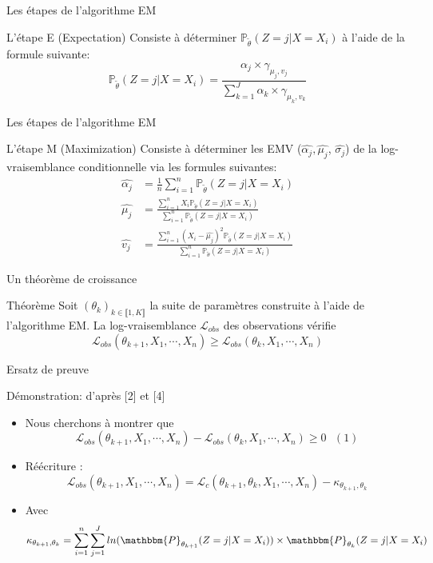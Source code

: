 \documentclass[11pt]{beamer}
\begin{document}
	\begin{frame}{Les étapes de l'algorithme EM}
		\begin{block}{L'étape E (Expectation)}
			Consiste à déterminer $\mathbb{P}_{\tilde{\theta}}(Z = j | X = X_i)$ à l'aide de la formule suivante:
			\[
				\mathbb{P}_{\tilde{\theta}}(Z = j| X = X_i) = \frac{\alpha_j \times \gamma_{\mu_j, v_j}}{\sum_{k=1}^{J} \alpha_k \times \gamma_{\mu_k, v_k}}
			\]
		\end{block}
	\end{frame}
	\begin{frame}{Les étapes de l'algorithme EM}
		\begin{block}{L'étape M (Maximization)}
			Consiste à déterminer les EMV ($\widehat{\alpha_j}, \widehat{\mu_j}$, $\widehat{\sigma_j}$) de la log-vraisemblance conditionnelle via les formules suivantes:
			\begin{align*}
				\widehat{\alpha_j} &= \frac{1}{n}\sum_{i=1}^n \mathbb{P}_{\tilde{\theta}}(Z = j| X = X_i) \\
				\widehat{\mu_j} &= \frac{\sum_{i=1}^n X_i\mathbb{P}_{\tilde{\theta}}(Z = j| X = X_i)}{\sum_{i=1}^n \mathbb{P}_{\tilde{\theta}}(Z = j| X = X_i)} \\
				\widehat{v_j} &= \frac{\sum_{i=1}^n (X_i -\widehat{\mu_j})^2 \mathbb{P}_{\tilde{\theta}}(Z = j| X = X_i)}{\sum_{i=1}^n\mathbb{P}_{\tilde{\theta}}(Z = j| X = X_i)}
			\end{align*}
		\end{block}
	\end{frame}

	\begin{frame}{Un théorème de croissance}
		\begin{block}{Théorème}
			Soit $(\theta_k)_{k\in \llbracket1, K\rrbracket}$ la suite de paramètres construite à l'aide de l'algorithme EM. \newline
La log-vraisemblance $\mathcal{L}_{obs}$ des observations vérifie 
		\[
		\mathcal{L}_{obs}(\theta_{k+1}, X_1, \cdots, X_n) \geq \mathcal{L}_{obs}(\theta_k, X_1, \cdots, X_n)
		\]
		\end{block}
	\end{frame}

	\begin{frame}{Ersatz de preuve}
		\begin{block}{Démonstration: d'après [2] et [4]}
			\begin{itemize}
				\item Nous cherchons à montrer que
				\[
				\mathcal{L}_{obs}(\theta_{k+1}, X_1, \cdots, X_n) - \mathcal{L}_{obs}(\theta_k, X_1, \cdots, X_n) \geq 0 \text{   }(1)
				\]
				\item Réécriture :
				\[
				 \mathcal{L}_{obs}(\theta_{k+1}, X_1, \cdots, X_n) = 
				\mathcal{L}_c(\theta_{k+1}, \theta_k, X_1, \cdots, X_n) - \kappa_{\theta_{k+1},\theta_k}
				\]
				\item Avec
					\[
					 \kappa_{\theta_{k+1},\theta_k} = \sum_{i=1}^n\sum_{j=1}^J ln(\mathbbm{P}_{\theta_{k+1}}(Z = j|X=X_i))\times\mathbbm{P}_{\theta_k}(Z = j|X = X_i)
					\]
			\end{itemize}	
		\end{block}
	\end{frame}
\end{document}
